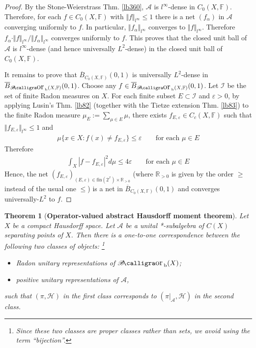 \documentclass[12pt,b5paper,notitlepage]{article}
\theoremstyle{definition}
\theoremstyle{plain}
\newtheorem{thm}[df]{Theorem}
\DeclareMathOperator{\Borb}{{\mathscr{B}\text{\kern -2pt {\calligra\large or}}\,}_{\mathrm b}}
\newcommand{\ovl}{\overline}
\newcommand{\scr}{\mathscr}
\newcommand{\Rbb}{\mathbb R}
\newcommand{\fin}{\mathrm{fin}}
\newcommand{\Fbb}{\mathbb F}
\newcommand{\eps}{\varepsilon}
\newcommand{\MH}{\mathcal H}
\numberwithin{equation}{section}
\begin{document}
\begin{proof}
By the Stone-Weierstrass Thm. \ref{lb360}, $\scr A$ is $l^\infty$-dense in $C_0(X,\Fbb)$. Therefore, for each $f\in C_0(X,\Fbb)$ with $\Vert f\Vert_{l^\infty}\leq 1$ there is a net $(f_\alpha)$ in $\scr A$ converging uniformly to $f$. In particular, $\Vert f_\alpha\Vert_{l^\infty}$ converges to $\Vert f\Vert_{l^\infty}$. Therefore $f_\alpha\cdot \Vert f\Vert_{l^\infty}/\Vert f_\alpha\Vert_{l^\infty}$ converges uniformly to $f$. This proves that the closed unit ball of $\scr A$ is $l^\infty$-dense (and hence universally $L^2$-dense) in the closed unit ball of $C_0(X,\Fbb)$.

It remains to prove that $\ovl B_{C_0(X,\Fbb)}(0,1)$ is universally $L^2$-dense in $\ovl B_{\Borb(X,\Fbb)}(0,1)$. Choose any $f\in \ovl B_{\Borb(X,\Fbb)}(0,1)$. Let $\scr I$ be the set of finite Radon measures on $X$. For each finite subset $E\subset\scr I$ and $\eps>0$, by applying Lusin's Thm. \ref{lb82} (together with the Tietze extension Thm. \ref{lb83}) to the finite Radon measure $\mu_E:=\sum_{\mu\in E}\mu$, there exists $f_{E,\eps}\in C_c(X,\Fbb)$ such that $\Vert f_{E,\eps}\Vert_{l^\infty}\leq 1$ and
\begin{align*}
\mu\{x\in X:f(x)\neq f_{E,\eps}\}\leq\eps\qquad\text{for each }\mu\in E
\end{align*}
Therefore
\begin{align*}
\int_X|f-f_{E,\eps}|^2d\mu\leq 4\eps\qquad\text{for each }\mu\in E
\end{align*}
Hence, the net $(f_{E,\eps})_{(E,\eps)\in\fin(2^{\scr I})\times\Rbb_{>0}}$ (where $\Rbb_{>0}$ is given by the order $\geq$ instead of the usual one $\leq$) is a net in $\ovl B_{C_0(X,\Fbb)}(0,1)$ and converges universally-$L^2$ to $f$.
\end{proof}




\begin{thm}[\textbf{Operator-valued abstract Hausdorff moment theorem}]\label{lb274}
Let $X$ be a compact Hausdorff space. Let $\scr A$ be a unital *-subalgebra of $C(X)$ separating points of $X$. Then there is a one-to-one correspondence between the following two classes of objects: \footnote{Since these two classes are proper classes rather than sets, we avoid using the term ``bijection''.}
\begin{itemize}
\item[(1)] Radon unitary representations of $\Borb(X)$;
\item[(2)] positive unitary representations of $\scr A$,
\end{itemize}
such that $(\pi,\MH)$ in the first class corresponds to $(\pi|_{\scr A},\MH)$ in the second class.
\end{thm}
\end{document}
